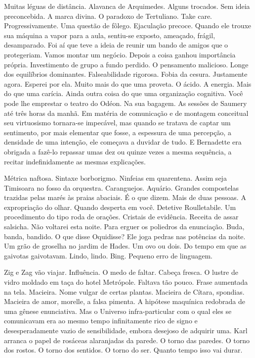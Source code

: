 Muitas léguas de distância. Alavanca de Arquimedes. Alguns trocados. Sem
ideia preconcebida. A marca divina. O paradoxo de Tertuliano. Take care.
Progressivamente. Uma questão de fôlego. Ejaculação precoce. Quando ele
trouxe sua máquina a vapor para a aula, sentiu-se exposto, ameaçado,
frágil, desamparado. Foi aí que teve a ideia de reunir um bando de
amigos que o protegeriam. Vamos montar um negócio. Depois a coisa ganhou
importância própria. Investimento de grupo a fundo perdido. O pensamento
malicioso. Longe dos equilíbrios dominantes. Falseabilidade rigorosa.
Fobia da cesura. Justamente agora. Esperei por ela. Muito mais do que
uma proveta. O ácido. A energia. Mais do que uma carícia. Ainda outra
coisa do que uma organização cognitiva. Você pode lhe emprestar o teatro
do Odéon. Na sua bagagem. As sessões de Saumery até três horas da manhã.
Em matéria de comunicação e de montagem conceitual seu virtuosismo
tornara-se impecável, mas quando se tratava de captar um sentimento, por
mais elementar que fosse, a espessura de uma percepção, a densidade de
uma intenção, ele começava a duvidar de tudo. E Bernadette era obrigada
a fazê-lo repassar umas dez ou quinze vezes a mesma sequência, a recitar
indefinidamente as mesmas explicações.

Métrica naftosa. Sintaxe borborigmo. Ninfeias em quarentena. Assim seja
Timisoara no fosso da orquestra. Caranguejos. Aquário. Grandes
compostelas trazidas pelas marés às praias abaciais. É o que dizem. Mais
de duas pessoas. A expropriação do olhar. Quando desperta em você.
Detetive Roulletabile. Um procedimento do tipo roda de orações. Cristais
de evidência. Receita de assar salsicha. Não voltarei esta noite. Para
erguer os poliedros da enunciação. Buda, banda, bandido. O que disse
Oquidisse? Ele joga pedras nas potências da noite. Um grão de groselha
no jardim de Hades. Um ovo ou dois. Do tempo em que as gaivotas
gaivotavam. Lindo, lindo. Bing. Pequeno erro de linguagem.

Zig e Zag vão viajar. Influência. O medo de faltar. Cabeça fresca. O
lustre de vidro moldado em taça do hotel Metrópole. Faltava tão pouco.
Frase aumentada na tela. Macieira. Nome vulgar de certas plantas.
Macieira de Cítara, spondias. Macieira de amor, morelle, a falsa
pimenta. A hipótese maquínica redobrada de uma gênese enunciativa. Mas o
Universo infra-particular com o qual eles se comunicavam era ao mesmo
tempo infinitamente rico de signo e desesperadamente vazio de
sensibilidade, embora desejoso de adquirir uma. Karl arranca o papel de
rosáceas alaranjadas da parede. O torno das paredes. O torno dos rostos.
O torno dos sentidos. O torno do ser. Quanto tempo isso vai durar.

